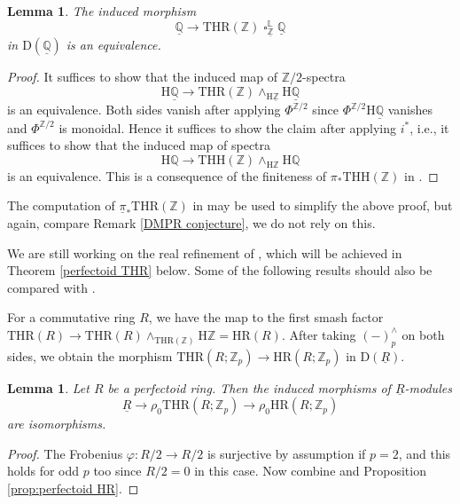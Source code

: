 \documentclass[10pt]{amsart}
\newtheorem{lem}[thm]{Lemma}
\theoremstyle{definition}
\numberwithin{equation}{section}
\renewcommand{\L}{\mathbb{L}}
\newcommand{\Q}{\mathbb{Q}}
\newcommand{\Z}{\mathbb{Z}}
\newcommand{\rD}{\mathrm{D}}
\newcommand{\rH}{\mathrm{H}}
\newcommand{\ul}{\underline}
\DeclareMathOperator{\sotimes}{\square}
\newcommand{\HR}{\mathrm{HR}}
\newcommand{\THH}{\mathrm{THH}}
\newcommand{\THR}{\mathrm{THR}}
\begin{document}
\begin{lem}
\label{lem:rational THR(Z)}
The induced morphism
\[
\ul{\Q}
\to
\THR(\Z)
\sotimes_{\ul{\Z}}^\L
\ul{\Q}
\]
in $\rD(\ul{\Q})$ is an equivalence.
\end{lem}
\begin{proof}
It suffices to show that the induced map of $\Z/2$-spectra
\[
\rH \ul{\Q}
\to
\THR(\Z)
\wedge_{\rH \ul{\Z}}
\rH \ul{\Q}
\]
is an equivalence.
Both sides vanish after applying $\Phi^{\Z/2}$ since $\Phi^{\Z/2}\rH \ul{\Q}$ vanishes and $\Phi^{\Z/2}$ is monoidal.
Hence it suffices to show the claim after applying $i^*$,
i.e.,
it suffices to show that the induced map of spectra
\[
\rH \Q \to \THH(\Z) \wedge_{\rH \Z} \rH \Q
\]
is an equivalence.
This is a consequence of the finiteness of $\pi_*\THH(\Z)$ in \cite[Lemma 2.5]{BMS19}.
\end{proof}

The computation of $\ul{\pi}_*\THR(\Z)$ in \cite[Theorem B.0.1]{AKF} may be used to simplify the above proof,
but again, compare Remark \ref{DMPR conjecture}, we do not rely on this.

We are still working on the real refinement of \cite[Theorem 6.1]{BMS19}, which will be achieved in Theorem \ref{perfectoid THR} below. Some of the following results should also be compared with \cite[Proposition IV.4.2]{NS}.

\medskip

For a commutative ring $R$,
we have the map to the first smash factor
\(
\THR(R)
\to
\THR(R)\wedge_{\THR(\Z)}\rH \Z
=
\HR(R).
\)
After taking $(-)_p^\wedge$ on both sides, we obtain the morphism $\THR(R;\Z_p)\to \HR(R;\Z_p)$ in $\rD(\ul{R})$.



\begin{lem}
\label{lem:zeroth slice}
Let $R$ be a perfectoid ring.
Then the induced morphisms of $\ul{R}$-modules
\[
\ul{R}
\to
\rho_0 \THR(R;\Z_p)
\to
\rho_0 \HR(R;\Z_p)
\]
are isomorphisms.
\end{lem}
\begin{proof}
The Frobenius $\varphi\colon R/2\to R/2$ is surjective by assumption if $p=2$, and this holds for odd $p$ too since $R/2=0$ in this case. Now
combine \cite{HP23erratum} and Proposition \ref{prop:perfectoid HR}.
\end{proof}
\end{document}
